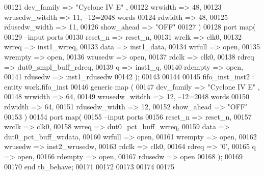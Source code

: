 \begin{DoxyCode}
00121       dev_family        => \textcolor{keyword}{"Cyclone IV E"}  ,
00122       wrwidth         => \textcolor{vhdllogic}{48},
00123       wrusedw_witdth  => \textcolor{vhdllogic}{11},\textcolor{keyword}{ --12=2048 words }
00124       rdwidth         => \textcolor{vhdllogic}{48},
00125       rdusedw_width   => \textcolor{vhdllogic}{11},
00126       show_ahead      => \textcolor{keyword}{"OFF"}
00127   \textcolor{vhdlchar}{)} 
00128   \textcolor{keywordflow}{port} \textcolor{keywordflow}{map}(
00129 \textcolor{keyword}{      --input ports }
00130       reset_n       => reset_n,
00131       wrclk         => clk0,
00132       wrreq         => inst1_wrreq,
00133       data          => inst1_data,
00134       wrfull        => \textcolor{keywordflow}{open},
00135         wrempty       => \textcolor{keywordflow}{open},
00136       wrusedw       => \textcolor{keywordflow}{open},
00137       rdclk          => clk0,
00138       rdreq         => dut0_smpl_buff_rdreq,
00139       q             => inst1_q,
00140       rdempty       => \textcolor{keywordflow}{open},
00141       rdusedw       => inst1_rdusedw
00142         \textcolor{vhdlchar}{)};
00143         
00144         
00145 fifo\_inst\_inst2 : \textcolor{keywordflow}{entity} work.fifo_inst
00146   \textcolor{keywordflow}{generic} \textcolor{keywordflow}{map} (
00147       dev_family        => \textcolor{keyword}{"Cyclone IV E"}  ,
00148       wrwidth         => \textcolor{vhdllogic}{64},
00149       wrusedw_witdth  => \textcolor{vhdllogic}{12},\textcolor{keyword}{ --12=2048 words }
00150       rdwidth         => \textcolor{vhdllogic}{64},
00151       rdusedw_width   => \textcolor{vhdllogic}{12},
00152       show_ahead      => \textcolor{keyword}{"OFF"}
00153   \textcolor{vhdlchar}{)} 
00154   \textcolor{keywordflow}{port} \textcolor{keywordflow}{map}(
00155 \textcolor{keyword}{      --input ports }
00156       reset_n       => reset_n,
00157       wrclk         => clk0,
00158       wrreq         => dut0_pct_buff_wrreq,
00159       data          => dut0_pct_buff_wrdata,
00160       wrfull        => \textcolor{keywordflow}{open},
00161         wrempty       => \textcolor{keywordflow}{open},
00162       wrusedw       => inst2_wrusedw,
00163       rdclk          => clk0,
00164       rdreq         => '0',
00165       q             => \textcolor{keywordflow}{open},
00166       rdempty       => \textcolor{keywordflow}{open},
00167       rdusedw       => \textcolor{keywordflow}{open}
00168         \textcolor{vhdlchar}{)};
00169     
00170     \textcolor{keywordflow}{end} \textcolor{vhdlchar}{tb\_behave};
00171   
00172   
00173 
00174 
00175   
\end{DoxyCode}
